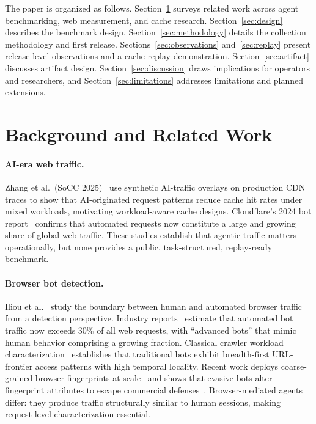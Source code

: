 \documentclass[10pt,sigconf,letterpaper,anonymous,nonacm]{acmart}
\begin{document}
The paper is organized as follows.
Section~\ref{sec:related} surveys related work across agent benchmarking,
web measurement, and cache research.
Section~\ref{sec:design} describes the benchmark design.
Section~\ref{sec:methodology} details the collection methodology and
first release.
Sections~\ref{sec:observations} and~\ref{sec:replay} present
release-level observations and a cache replay demonstration.
Section~\ref{sec:artifact} discusses artifact design.
Section~\ref{sec:discussion} draws implications for operators and
researchers, and Section~\ref{sec:limitations} addresses limitations
and planned extensions.

\section{Background and Related Work}
\label{sec:related}

\paragraph{AI-era web traffic.}
Zhang et al.~(SoCC 2025)~\cite{zhang2025} use synthetic AI-traffic
overlays on production CDN traces to show that AI-originated request
patterns reduce cache hit rates under mixed workloads, motivating
workload-aware cache designs.
Cloudflare's 2024 bot report~\cite{cloudflare2024bots} confirms that
automated requests now constitute a large and growing share of global
web traffic.  These studies establish that agentic
traffic matters operationally, but none provides a public,
task-structured, replay-ready benchmark.

\paragraph{Browser bot detection.}
Iliou et al.~\cite{iliou2019advanced} study the boundary between human
and automated browser traffic from a detection perspective.
Industry reports~\cite{imperva2024} estimate that automated bot traffic
now exceeds 30\% of all web requests, with ``advanced bots'' that
mimic human behavior comprising a growing fraction.
Classical crawler workload characterization~\cite{arlitt2000} establishes
that traditional bots exhibit breadth-first URL-frontier access patterns
with high temporal locality.  Recent work deploys coarse-grained browser fingerprints at scale~\cite{kalantari2024browserpolygraph} and shows that evasive bots alter fingerprint attributes to escape commercial defenses~\cite{venugopalan2025fpinconsistent}.  Browser-mediated agents differ: they
produce traffic structurally similar to human sessions, making
request-level characterization essential.
\end{document}
